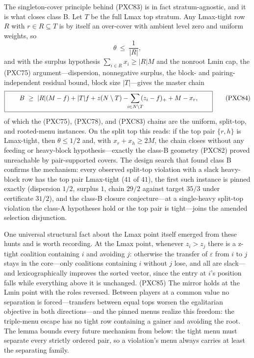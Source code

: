\documentclass[11pt]{article}
\begin{document}
The singleton-cover principle behind (PXC83) is in fact
stratum-agnostic, and it is what closes class B.  Let $T$ be the full
Lmax top stratum.  Any Lmax-tight row $R$ with $r\in R\subseteq T$ is
by itself an over-cover with ambient level zero and uniform weights, so
\[
 \theta\ \le\ \frac{1}{|R|},                          \tag{PXC84a}
\]
and with the surplus hypothesis $\sum_{i\in R}x_i\ge|R|M$ and the
nonroot Lmin cap, the (PXC75) argument---dispersion, nonnegative
surplus, the block- and pairing-independent residual bound, block size
$|T|$---gives the master chain
\[
 \boxed{\qquad
 B\ \ge\ |R|(M-f)+|T|f
 +z(N\setminus T)-\hskip-4pt\sum_{i\in N\setminus T}\hskip-4pt(z_i-f)_+
 +M-x_r,
 \qquad}                                             \tag{PXC84}
\]
of which the (PXC75), (PXC78), and (PXC83) chains are the uniform,
split-top, and rooted-menu instances.  On the split top this reads:
if the top pair $\{r,h\}$ is Lmax-tight, then $\theta\le1/2$ and, with
$x_r+x_h\ge2M$, the chain closes without any feeding or heavy-block
hypothesis---exactly the class-B geometry (PXC82) proved unreachable
by pair-supported covers.  The design search that found class B
confirms the mechanism: every observed split-top violation with a
slack heavy-block row has the top pair Lmax-tight ($41$ of $41$), the
first such instance is pinned exactly (dispersion $1/2$, surplus $1$,
chain $29/2$ against target $35/3$ under certificate $31/2$), and the
class-B closure conjecture---at a single-heavy split-top violation the
class-A hypotheses hold or the top pair is tight---joins the amended
selection disjunction.

One universal structural fact about the Lmax point itself emerged from
these hunts and is worth recording.  At the Lmax point, whenever
$z_i>z_j$ there is a z-tight coalition containing $i$ and avoiding
$j$: otherwise the transfer of $\varepsilon$ from $i$ to $j$ stays in
the core---only coalitions containing $i$ without $j$ lose, and all
are slack---and lexicographically improves the sorted vector, since
the entry at $i$'s position falls while everything above it is
unchanged.                                             \hfill(PXC85)
The mirror holds at the Lmin point with the roles reversed.  Between
players at a common value no separation is forced---transfers between
equal tops worsen the egalitarian objective in both directions---and
the pinned menus realize this freedom: the triple-menu escape has no
tight row containing a gainer and avoiding the root.  The lemma
bounds every future mechanism from below: the tight menu must
separate every strictly ordered pair, so a violation's menu always
carries at least the separating family.
\end{document}
